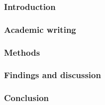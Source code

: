 \subsubsection{Introduction}\label{chapter:research_introduction}


% 

\subsubsection{Academic writing}\label{chapter:research_preliminaries}


\subsubsection{Methods}\label{chapter:research_method}


\subsubsection{Findings and discussion}\label{chapter:research_results}


\subsubsection{Conclusion}\label{chapter:research_conclusion}
